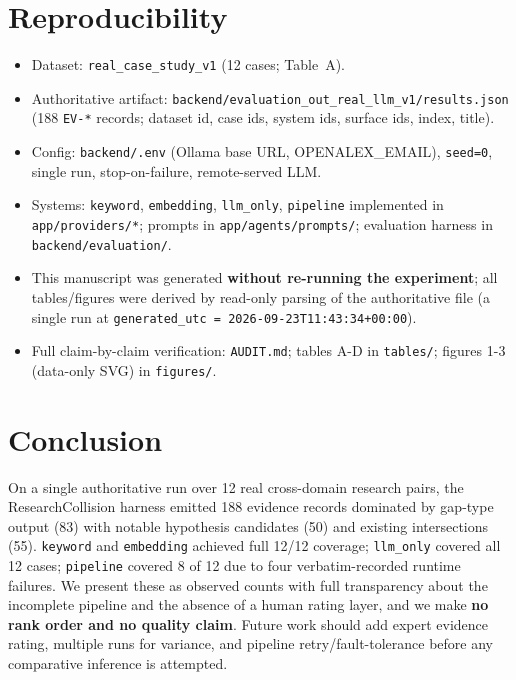 \documentclass[11pt]{article}
\begin{document}
\section{Reproducibility}
\label{sec:repro}
\begin{itemize}
\item Dataset: \texttt{real\_case\_study\_v1} (12 cases; Table~A).
\item Authoritative artifact: \texttt{backend/evaluation\_out\_real\_llm\_v1/results.json}
      (188 \texttt{EV-*} records; dataset id, case ids, system ids, surface ids,
      index, title).
\item Config: \texttt{backend/.env} (Ollama base URL, OPENALEX\_EMAIL),
      \texttt{seed=0}, single run, stop-on-failure, remote-served LLM.
\item Systems: \texttt{keyword}, \texttt{embedding}, \texttt{llm\_only},
      \texttt{pipeline} implemented in \texttt{app/providers/*}; prompts in
      \texttt{app/agents/prompts/}; evaluation harness in
      \texttt{backend/evaluation/}.
\item This manuscript was generated \textbf{without re-running the experiment};
      all tables/figures were derived by read-only parsing of the authoritative
      file (a single run at
      \texttt{generated\_utc = 2026-09-23T11:43:34+00:00}).
\item Full claim-by-claim verification: \texttt{AUDIT.md}; tables A-D in
      \texttt{tables/}; figures 1-3 (data-only SVG) in \texttt{figures/}.
\end{itemize}

\section{Conclusion}
\label{sec:conclusion}
On a single authoritative run over 12 real cross-domain research pairs, the
ResearchCollision harness emitted 188 evidence records dominated by gap-type
output (83) with notable hypothesis candidates (50) and existing intersections
(55). \texttt{keyword} and \texttt{embedding} achieved full 12/12 coverage;
\texttt{llm\_only} covered all 12 cases; \texttt{pipeline} covered 8 of 12 due to
four verbatim-recorded runtime failures. We present these as observed counts with
full transparency about the incomplete pipeline and the absence of a human rating
layer, and we make \textbf{no rank order and no quality claim}. Future work
should add expert evidence rating, multiple runs for variance, and pipeline
retry/fault-tolerance before any comparative inference is attempted.
\end{document}
